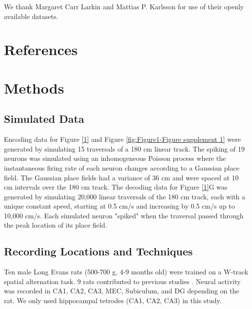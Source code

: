 \documentclass[times, twoside]{zHenriquesLab-StyleBioRxiv}
\begin{document}
\begin{acknowledgements}
We thank Margaret Carr Larkin and Mattias P. Karlsson for use of their openly available datasets.
\end{acknowledgements}

\section*{References}


\onecolumn
\newpage

\section*{Methods}

\subsection*{Simulated Data}
Encoding data for Figure \ref{1} and Figure \ref{fig:Figure1-Figure supplement 1} were generated by simulating 15 traversals of a 180 cm linear track. The spiking of 19 neurons was simulated using an inhomogeneous Poisson process where the instantaneous firing rate of each neuron changes according to a Gaussian place field. The Gaussian place fields had a variance of 36 cm and were spaced at 10 cm intervals over the 180 cm track. The decoding data for Figure \ref{1}G was generated by simulating 20,000 linear traversals of the 180 cm track, each with a unique constant speed, starting at 0.5 cm/s and increasing by 0.5 cm/s up to 10,000 cm/s. Each simulated neuron "spiked" when the traversal passed through the peak location of its place field.

\subsection*{Recording Locations and Techniques}
Ten male Long Evans rats (500-700 g, 4-9 months old) were trained on a W-track spatial alternation task. 9 rats contributed to previous studies \cite{KarlssonAwakereplayremote2009, KayConstantSubsecondCycling2020, Kayhippocampalnetworkspatial2016, CarrTransientSlowGamma2012}. Neural activity was recorded in CA1, CA2, CA3, MEC, Subiculum, and DG depending on the rat. We only used hippocampal tetrodes (CA1, CA2, CA3) in this study.
\end{document}
